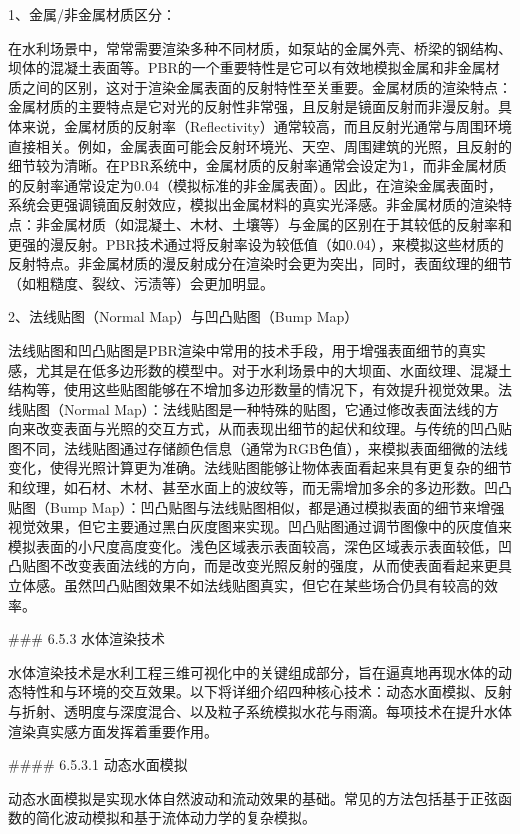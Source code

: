1、金属/非金属材质区分：

在水利场景中，常常需要渲染多种不同材质，如泵站的金属外壳、桥梁的钢结构、坝体的混凝土表面等。PBR的一个重要特性是它可以有效地模拟金属和非金属材质之间的区别，这对于渲染金属表面的反射特性至关重要。金属材质的渲染特点：金属材质的主要特点是它对光的反射性非常强，且反射是镜面反射而非漫反射。具体来说，金属材质的反射率（Reflectivity）通常较高，而且反射光通常与周围环境直接相关。例如，金属表面可能会反射环境光、天空、周围建筑的光照，且反射的细节较为清晰。在PBR系统中，金属材质的反射率通常会设定为1，而非金属材质的反射率通常设定为0.04（模拟标准的非金属表面）。因此，在渲染金属表面时，系统会更强调镜面反射效应，模拟出金属材料的真实光泽感。非金属材质的渲染特点：非金属材质（如混凝土、木材、土壤等）与金属的区别在于其较低的反射率和更强的漫反射。PBR技术通过将反射率设为较低值（如0.04），来模拟这些材质的反射特点。非金属材质的漫反射成分在渲染时会更为突出，同时，表面纹理的细节（如粗糙度、裂纹、污渍等）会更加明显。

2、法线贴图（Normal Map）与凹凸贴图（Bump Map）

法线贴图和凹凸贴图是PBR渲染中常用的技术手段，用于增强表面细节的真实感，尤其是在低多边形数的模型中。对于水利场景中的大坝面、水面纹理、混凝土结构等，使用这些贴图能够在不增加多边形数量的情况下，有效提升视觉效果。法线贴图（Normal Map）：法线贴图是一种特殊的贴图，它通过修改表面法线的方向来改变表面与光照的交互方式，从而表现出细节的起伏和纹理。与传统的凹凸贴图不同，法线贴图通过存储颜色信息（通常为RGB色值），来模拟表面细微的法线变化，使得光照计算更为准确。法线贴图能够让物体表面看起来具有更复杂的细节和纹理，如石材、木材、甚至水面上的波纹等，而无需增加多余的多边形数。凹凸贴图（Bump Map）：凹凸贴图与法线贴图相似，都是通过模拟表面的细节来增强视觉效果，但它主要通过黑白灰度图来实现。凹凸贴图通过调节图像中的灰度值来模拟表面的小尺度高度变化。浅色区域表示表面较高，深色区域表示表面较低，凹凸贴图不改变表面法线的方向，而是改变光照反射的强度，从而使表面看起来更具立体感。虽然凹凸贴图效果不如法线贴图真实，但它在某些场合仍具有较高的效率。

\#\#\# 6.5.3 水体渲染技术

水体渲染技术是水利工程三维可视化中的关键组成部分，旨在逼真地再现水体的动态特性和与环境的交互效果。以下将详细介绍四种核心技术：动态水面模拟、反射与折射、透明度与深度混合、以及粒子系统模拟水花与雨滴。每项技术在提升水体渲染真实感方面发挥着重要作用。

\#\#\#\# 6.5.3.1 动态水面模拟

动态水面模拟是实现水体自然波动和流动效果的基础。常见的方法包括基于正弦函数的简化波动模拟和基于流体动力学的复杂模拟。

